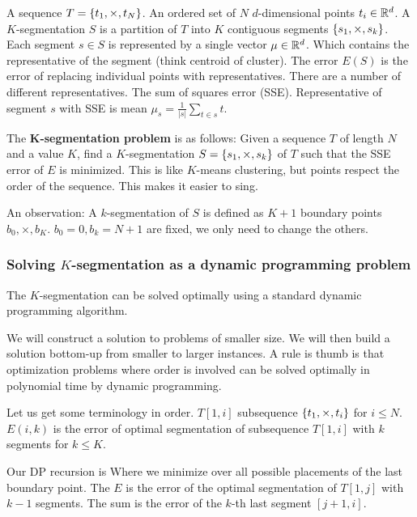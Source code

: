         A sequence $T = \{t_1, \times, t_N\}$. An ordered set of $N$ $d$-dimensional points $t_i \in \mathbb{R}^d$. A $K$-segmentation $S$ is a partition of $T$ into $K$ contiguous segments $\{s_1, \times, s_k\}$. Each segment $s \in S$ is represented by a single vector $\mu \in \mathbb{R}^d$. Which contains the representative of the segment (think centroid of cluster). The error $E(S)$ is the error of replacing individual points with representatives. There are a number of different representatives. The sum of squares error (SSE). 
        Representative of segment $s$ with SSE is mean $\mu_s = \frac{1}{|s|}\sum_{t \in s}t$. 
        
        The \textbf{K-segmentation problem} is as follows: Given a sequence $T$ of length $N$ and a value $K$, find a $K$-segmentation $S = \{s_1, \times, s_k\}$ of $T$ such that the SSE error of $E$ is minimized. This is like $K$-means clustering, but points respect the order of the sequence. This makes it easier to sing.
        
        An observation: A $k$-segmentation of $S$ is defined as $K + 1$ boundary points $b_0, \times, b_K$. $b_0 = 0, b_k = N + 1$ are fixed, we only need to change the others. 
        
    \subsubsection{Solving $K$-segmentation as a dynamic programming problem}
        The $K$-segmentation can be solved optimally using a standard dynamic programming algorithm. 
        
        We will construct a solution to problems of smaller size. We will then build a solution bottom-up from smaller to larger instances. A rule is thumb is that optimization problems where order is involved can be solved optimally in polynomial time by dynamic programming. 
        
        Let us get some terminology in order. $T[1, i]$ subsequence $\{t_1, \times, t_i\}$ for $i \leq N$. $E(i, k)$ is the error of optimal segmentation of subsequence $T[1, i]$ with $k$ segments for $k \leq K$.
        
        Our DP recursion is 
        Where we minimize over all possible placements of the last boundary point. The $E$ is the error of the optimal segmentation of $T[1, j]$ with $k-1$ segments. The sum is the error of the $k$-th last segment $[j+1, i]$.
        

